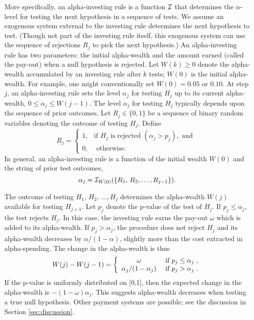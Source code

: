 \documentclass[12pt]{article}
\begin{document}
More specifically, an alpha-investing rule is a function $\cal I$ that
determines the $\alpha$-level for testing the next hypothesis in a
sequence of tests.  We assume an exogenous system external to the
investing rule determines the next hypothesis to test.  (Though not
part of the investing rule itself, this exogenous system can use the
sequence of rejections $R_j$ to pick the next hypothesis.)  An alpha-investing rule has two parameters: the initial
alpha-wealth and the amount earned (called the pay-out) when a null
hypothesis is rejected.  Let $W(k) \ge 0$ denote the alpha-wealth
accumulated by an investing rule after $k$ tests; $W(0)$ is the
initial alpha-wealth.  For example, one might conventionally set $W(0)
= 0.05$ or $0.10$.  At step $j$, an alpha-investing rule sets the
level $\alpha_j$ for testing $H_j$ up to its current alpha-wealth, 
 $0 \le \alpha_j \le W(j-1)$.  The level $\alpha_j$ for testing $H_j$
typically depends upon the sequence of prior outcomes.  Let $R_j \in \{0,1\}$ be a sequence of binary random variables denoting the outcome of testing $H_{j}$.  Define
\begin{equation}
   R_{j} = \left\{\begin{array}{cl}
       1, & \mbox{if } H_{j} \mbox{ is rejected }(\alpha_{j}>p_{j}),\mbox{ and } \\
       0, & \mbox{ otherwise.}
       \end{array} \right.
\label{eq:Rj}
\end{equation}
In general, an alpha-investing rule is a function of the initial wealth $W(0)$ and the string of prior test outcomes,
\begin{equation}
  \alpha_j = {\cal I}_{W(0)}(\{R_1,\, R_2, \ldots,R_{j-1}\}).
\label{eq:invest-rule}
\end{equation}


The outcome of testing $H_{1},\,H_{2},\,\ldots,H_{j}$ determines the alpha-wealth
$W(j)$ available for testing $H_{j+1}$.  Let $p_j$ denote the
p-value of the test of $H_j$.  If $p_j \le \alpha_j$, the test rejects
$H_j$.  In this case, the investing rule earns the pay-out $\omega$ which is
added to its alpha-wealth.  If $p_j > \alpha_j$, the procedure does not
reject $H_j$ and its alpha-wealth decreases by $\alpha/(1-\alpha)$, slightly more than the cost extracted in alpha-spending.  The change in the alpha-wealth is thus
\begin{equation}
  W(j) - W(j-1) =
   \left\{ \begin{array}{cc}
                \omega                            & \mbox{ if } p_j \le \alpha_j  \;,\cr
                 \alpha_j/(1-\alpha_{j})     & \mbox{ if } p_j > \alpha_j   \;.
           \end{array} \right.
\label{eq:Wm}
\end{equation}
If the p-value is uniformly distributed on [0,1], then the expected
 change in the alpha-wealth is $-(1 - \omega) \alpha_j$.  This suggests
 alpha-wealth decreases when testing a true null hypothesis. Other payment systems are possible; see the discussion in Section \ref{sec:discussion}.
\end{document}
